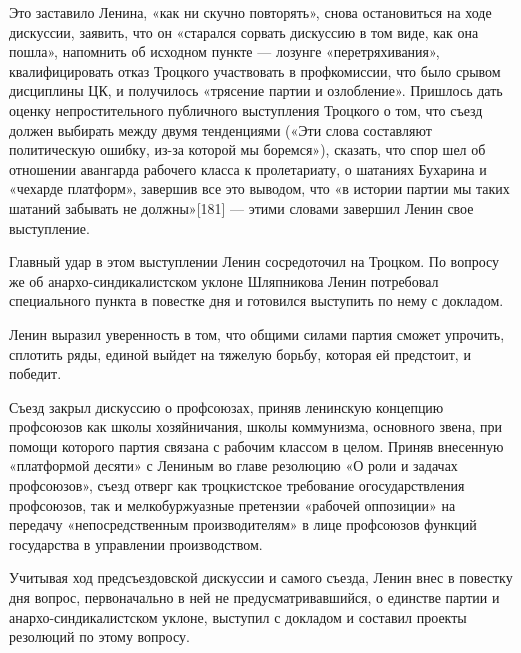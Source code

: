 \documentclass[12pt, a4paper, openany]{book}
\begin{document}
Это заставило Ленина, «как ни скучно повторять», снова остановиться на ходе дискуссии, заявить, что он «старался сорвать дискуссию в том виде, как она пошла», напомнить об исходном пункте — лозунге «перетряхивания», квалифицировать отказ Троцкого участвовать в профкомиссии, что было срывом дисциплины ЦК, и получилось «трясение партии и озлобление». Пришлось дать оценку непростительного публичного выступления Троцкого о том, что съезд должен выбирать между двумя тенденциями («Эти слова составляют политическую ошибку, из-за которой мы боремся»), сказать, что спор шел об отношении авангарда рабочего класса к пролетариату, о шатаниях Бухарина и «чехарде платформ», завершив все это выводом, что «в истории партии мы таких шатаний забывать не должны»[181] — этими словами завершил Ленин свое выступление.

Главный удар в этом выступлении Ленин сосредоточил на Троцком. По вопросу же об анархо-синдикалистском уклоне Шляпникова Ленин потребовал специального пункта в повестке дня и готовился выступить по нему с докладом.

Ленин выразил уверенность в том, что общими силами партия сможет упрочить, сплотить ряды, единой выйдет на тяжелую борьбу, которая ей предстоит, и победит.

Съезд закрыл дискуссию о профсоюзах, приняв ленинскую концепцию профсоюзов как школы хозяйничания, школы коммунизма, основного звена, при помощи которого партия связана с рабочим классом в целом. Приняв внесенную «платформой десяти» с Лениным во главе резолюцию «О роли и задачах профсоюзов», съезд отверг как троцкистское требование огосударствления профсоюзов, так и мелкобуржуазные претензии «рабочей оппозиции» на передачу «непосредственным производителям» в лице профсоюзов функций государства в управлении производством.

Учитывая ход предсъездовской дискуссии и самого съезда, Ленин внес в повестку дня вопрос, первоначально в ней не предусматривавшийся, о единстве партии и анархо-синдикалистском уклоне, выступил с докладом и составил проекты резолюций по этому вопросу.
\end{document}
